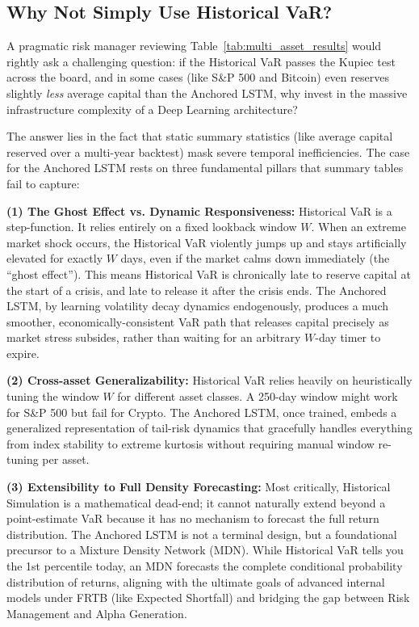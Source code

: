 \subsection{Why Not Simply Use Historical VaR?}

A pragmatic risk manager reviewing Table~\ref{tab:multi_asset_results} would rightly ask a challenging question: if the Historical VaR passes the Kupiec test across the board, and in some cases (like S\&P 500 and Bitcoin) even reserves slightly \emph{less} average capital than the Anchored LSTM, why invest in the massive infrastructure complexity of a Deep Learning architecture?

The answer lies in the fact that static summary statistics (like average capital reserved over a multi-year backtest) mask severe temporal inefficiencies. The case for the Anchored LSTM rests on three fundamental pillars that summary tables fail to capture:

\textbf{(1) The Ghost Effect vs. Dynamic Responsiveness:} Historical VaR is a step-function. It relies entirely on a fixed lookback window $W$. When an extreme market shock occurs, the Historical VaR violently jumps up and stays artificially elevated for exactly $W$ days, even if the market calms down immediately (the ``ghost effect''). This means Historical VaR is chronically late to reserve capital at the start of a crisis, and late to release it after the crisis ends. The Anchored LSTM, by learning volatility decay dynamics endogenously, produces a much smoother, economically-consistent VaR path that releases capital precisely as market stress subsides, rather than waiting for an arbitrary $W$-day timer to expire.

\textbf{(2) Cross-asset Generalizability:} Historical VaR relies heavily on heuristically tuning the window $W$ for different asset classes. A 250-day window might work for S\&P 500 but fail for Crypto. The Anchored LSTM, once trained, embeds a generalized representation of tail-risk dynamics that gracefully handles everything from index stability to extreme kurtosis without requiring manual window re-tuning per asset.

\textbf{(3) Extensibility to Full Density Forecasting:} Most critically, Historical Simulation is a mathematical dead-end; it cannot naturally extend beyond a point-estimate VaR because it has no mechanism to forecast the full return distribution. The Anchored LSTM is not a terminal design, but a foundational precursor to a Mixture Density Network (MDN). While Historical VaR tells you the 1st percentile today, an MDN forecasts the complete conditional probability distribution of returns, aligning with the ultimate goals of advanced internal models under FRTB (like Expected Shortfall) and bridging the gap between Risk Management and Alpha Generation.


